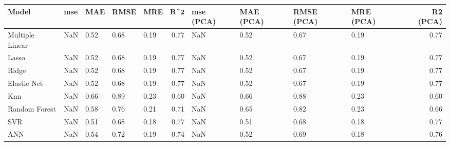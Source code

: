 \begin{table}
\centering
\label{table:iri_reg_pred}
\begin{tabular}{lllllrllllr}
\toprule
 \textbf{Model} & \textbf{mse} & \textbf{MAE} & \textbf{RMSE} & \textbf{MRE} & $\textbf{R^2}$ & \textbf{mse (PCA)} & \textbf{MAE (PCA)} & \textbf{RMSE (PCA)} & \textbf{MRE (PCA)} & \textbf{R2 (PCA)} \\
\midrule
Multiple Linear &          NaN &         0.52 &          0.68 &         0.19 &           0.77 &                NaN &               0.52 &                0.67 &               0.19 &              0.77 \\
          Lasso &          NaN &         0.52 &          0.68 &         0.19 &           0.77 &                NaN &               0.52 &                0.67 &               0.19 &              0.77 \\
          Ridge &          NaN &         0.52 &          0.68 &         0.19 &           0.77 &                NaN &               0.52 &                0.67 &               0.19 &              0.77 \\
    Elastic Net &          NaN &         0.52 &          0.68 &         0.19 &           0.77 &                NaN &               0.52 &                0.67 &               0.19 &              0.77 \\
            Knn &          NaN &         0.66 &          0.89 &         0.23 &           0.60 &                NaN &               0.66 &                0.88 &               0.23 &              0.60 \\
  Random Forest &          NaN &         0.58 &          0.76 &         0.21 &           0.71 &                NaN &               0.65 &                0.82 &               0.23 &              0.66 \\
            SVR &          NaN &         0.51 &          0.68 &         0.18 &           0.77 &                NaN &               0.51 &                0.68 &               0.18 &              0.77 \\
            ANN &          NaN &         0.54 &          0.72 &         0.19 &           0.74 &                NaN &               0.52 &                0.69 &               0.18 &              0.76 \\
\bottomrule
\end{tabular}
\end{table}
